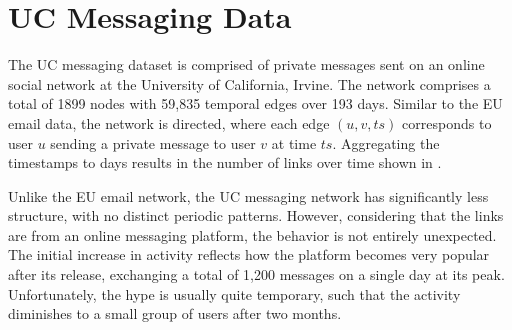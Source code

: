 \section{UC Messaging Data}

The UC messaging dataset is comprised of private messages sent on an online social network at the University of California, Irvine. The network comprises a total of 1899 nodes with 59,835 temporal edges over 193 days. Similar to the EU email data, the network is directed, where each edge $(u,v,ts)$ corresponds to user $u$ sending a private message to user $v$ at time $ts$. Aggregating the timestamps to days results in the number of links over time shown in .

Unlike the EU email network, the UC messaging network has significantly less structure, with no distinct periodic patterns. However, considering that the links are from an online messaging platform, the behavior is not entirely unexpected. The initial increase in activity reflects how the platform becomes very popular after its release, exchanging a total of 1,200 messages on a single day at its peak. Unfortunately, the hype is usually quite temporary, such that the activity diminishes to a small group of users after two months. 